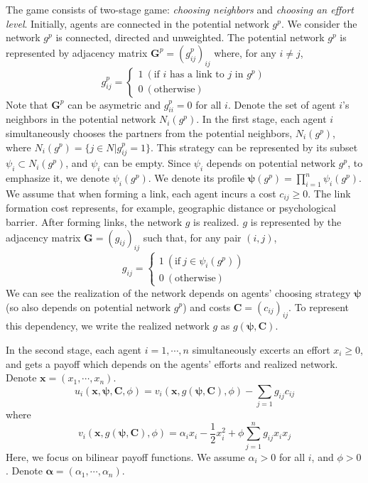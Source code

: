 \documentclass[12pt]{article}
\theoremstyle{definition}
\begin{document}
The game consists of two-stage game: {\it{choosing neighbors}} and {\it{choosing an effort level}}.
Initially, agents are connected in the potential network $g^p$.
We consider the network $g^p$ is connected, directed and unweighted.
The potential network $g^p$ is represented by adjacency matrix $\bm{G}^p = {(g_{ij}^p)}_{ij}$ where, for any $i \neq j$,
\[ g_{ij}^p =
	\begin{cases}
		1 \  (\text{if $i$ has a link to $j$ in $g^p $}) \\
		0 \  (\text{otherwise})
	\end{cases} \]
Note that $\bm{G}^p$ can be asymetric and $g_{ii}^p = 0$ for all $i$.
Denote the set of agent $i$'s neighbors in the potential network $N_i(g^p)$.
In the first stage, each agent $i$ simultaneously chooses the partners from the potential neighbors, $N_i(g^p)$, where $N_i(g^p) = \{ j \in N | g_{ij}^p = 1 \}$.
This strategy can be represented by its subset $\psi_i \subset N_i(g^p)$, and $\psi_i$ can be empty.
Since $\psi_i$ depends on potential network $g^p$, to emphasize it, we denote $\psi_i(g^p)$.
We denote its profile $\bm{\psi}(g^p) = \prod_{i=1}^n \psi_i(g^p)$.
We assume that when forming a link, each agent incurs a cost $c_{ij} \ge 0$.
The link formation cost represents, for example, geographic distance or psychological barrier.
After forming links, the network $g$ is realized.
$g$ is represented by the adjacency matrix $\bm{G} = {(g_{ij})}_{ij}$ such that, for any pair $(i,j)$,
\[ g_{ij} = 
	\begin{cases}
		1 \  (\text{if} \  j \in \psi_i(g^p) ) \\
		0 \  (\text{otherwise})
	\end{cases} \]
We can see the realization of the network depends on agents' choosing strategy $\bm{\psi}$ (so also depends on potential network $g^p$) and costs $\bm{C} = {(c_{ij})}_{ij}$.
To represent this dependency, we write the realized network $g$ as $g(\bm{\psi}, \bm{C})$.

In the second stage, each agent $i = 1, \cdots, n$ simultaneously excerts an effort $x_i \ge 0$, and gets a payoff which depends on the agents' efforts and realized network.
Denote $\bm{x} = (x_1, \cdots, x_n)$.
\[ u_i(\bm{x}, \bm{\psi}, \bm{C}, \phi) = v_i(\bm{x}, g(\bm{\psi}, \bm{C}), \phi) - \sum_{j=1} g_{ij} c_{ij} \]
where
\[ v_i(\bm{x}, g(\bm{\psi}, \bm{C}), \phi) = \alpha_i x_i - \frac{1}{2} x_i^2 + \phi \sum_{j=1}^n g_{ij} x_i x_j \]
Here, we focus on bilinear payoff functions.
We assume $\alpha_i > 0$ for all $i$, and $\phi > 0$.
Denote $\bm{\alpha} = (\alpha_1, \cdots, \alpha_n)$.
\end{document}
